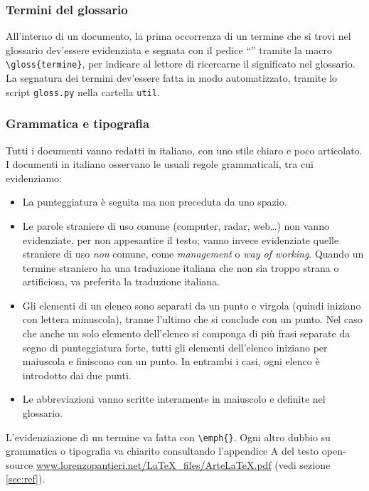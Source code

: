 \subsubsection{Termini del glossario} All'interno di un documento, la prima occorrenza di un termine che si trovi nel glossario dev'essere evidenziata e segnata con il pedice “” tramite la macro \texttt{\textbackslash gloss\{termine\}}, per indicare al lettore di ricercarne il significato nel glossario. La segnatura dei termini dev'essere fatta in modo automatizzato, tramite lo script \texttt{gloss.py} nella cartella \texttt{util}.

\subsubsection{Grammatica e tipografia} Tutti i documenti vanno redatti in italiano, con uno stile chiaro e poco articolato. I documenti in italiano osservano le usuali regole grammaticali, tra cui evidenziamo:
\begin{itemize}
	\item La punteggiatura è seguita ma non preceduta da uno spazio.
	\item Le parole straniere di uso comune (computer, radar, web\dots) non vanno evidenziate, per non appesantire il testo; vanno invece evidenziate quelle straniere di uso \emph{non} comune, come \emph{management} o \emph{way of working}. Quando un termine straniero ha una traduzione italiana che non sia troppo strana o artificiosa, va preferita la traduzione italiana.
	\item Gli elementi di un elenco sono separati da un punto e virgola (quindi iniziano con lettera minuscola), tranne l'ultimo che si conclude con un punto. Nel caso che anche un solo elemento dell'elenco si componga di più frasi separate da segno di punteggiatura forte, tutti gli elementi dell'elenco iniziano per maiuscola e finiscono con un punto. In entrambi i casi, ogni elenco è introdotto dai due punti.
	\item Le abbreviazioni vanno scritte interamente in maiuscolo e definite nel glossario.
\end{itemize}
L'evidenziazione di un termine va fatta con \texttt{\textbackslash emph\{\}}. Ogni altro dubbio su grammatica o tipografia va chiarito consultando l'appendice A del testo open-source \url{www.lorenzopantieri.net/LaTeX_files/ArteLaTeX.pdf} (vedi sezione \ref{sec:ref}).

